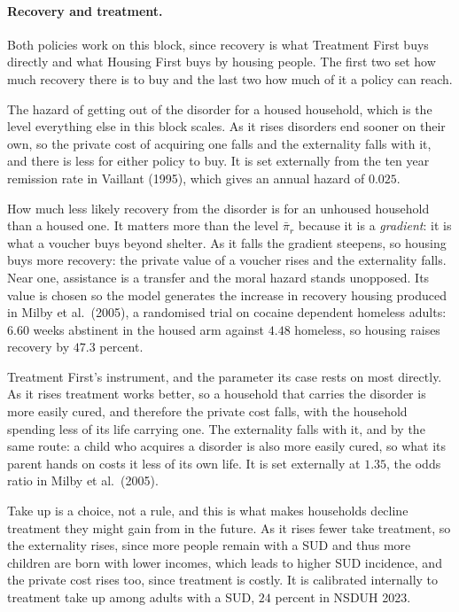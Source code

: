 \documentclass[10pt]{article}
\begin{document}
\paragraph{Recovery and treatment.} Both policies work on this block,
since recovery is what Treatment First buys directly and what Housing First buys by
housing people. The first two set how much recovery there is to buy and the last two
how much of it a policy can reach.
\begin{description}\setlength{\itemsep}{0.25em}\setlength{\parskip}{0em}
\item[$\bar\pi_r$, the baseline SUD recovery rate.] The hazard of getting out of the
disorder for a housed household, which is the level everything else in this block
scales. As it rises disorders end sooner on their own, so the private
cost of acquiring one falls and the externality falls with it, and there is less for
either policy to buy. It is set externally from the ten
year remission rate in Vaillant (1995), which gives an annual hazard of
$0.025$.
\item[$\mu_H$, SUD recovery when homeless.] How much less likely recovery from the
disorder is for an unhoused household than a housed one. It matters more than the
level $\bar\pi_r$ because it is a \emph{gradient}: it is what a voucher buys beyond
shelter. As it falls the gradient steepens, so housing buys more
recovery: the private value of a voucher rises and the externality falls. Near one, assistance is a transfer and the
moral hazard stands unopposed. Its value is chosen so the model generates the
increase in recovery housing produced in Milby et al.\ (2005), a randomised trial on
cocaine dependent homeless adults: $6.60$ weeks abstinent in the housed arm against
$4.48$ homeless, so housing raises recovery by $47.3$ percent.
\item[$g$, the treatment effect on recovery.] Treatment First's instrument, and the
parameter its case rests on most directly. As it rises treatment works
better, so a household that carries the disorder is more easily cured, and
therefore the private cost falls, with the household spending less of its
life carrying one. The
externality falls with it, and by the same route: a child who acquires a disorder is
also more easily cured, so what its parent hands on costs it less of its own life. It is set externally at $1.35$, the
odds ratio in Milby et al.\ (2005).
\item[$\bar\tau^{u}$, the utility cost of treatment.] Take up is a choice, not a
rule, and this is what makes households decline treatment they might gain
from in the future. As it rises fewer take treatment, so the externality rises, since
more people remain with a SUD and thus more children are born with lower
incomes, which leads to higher SUD incidence, and the private cost rises too, since
treatment is costly. It is calibrated internally to treatment take up among adults
with a SUD, $24$ percent in NSDUH 2023.
\end{description}
\end{document}
